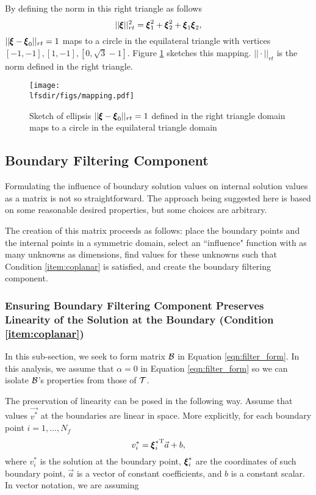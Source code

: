 By defining the norm in this right triangle as follows
\begin{equation}
\label{eqn:rect_norm}
||{\pmb \xi}||^2_{rt} = {\pmb \xi}_1^2 + {\pmb \xi}_2^2 + {\pmb \xi}_1{\pmb \xi}_2,
\end{equation}
$||{\pmb \xi} -{\pmb \xi}_0||_{rt} = 1$ maps to a circle in the equilateral triangle with vertices $[-1,-1],[1,-1],[0,\sqrt{3}-1]$. Figure \ref{fig:mapping} sketches this mapping. $||\cdot||_{rt}$ is the norm defined in the right triangle.


\begin{figure}\centering
\texttt{[image: \\lfsdir/figs/mapping.pdf]}
\caption{Sketch of ellipsis $||{\pmb \xi} -{\pmb \xi}_0||_{rt} = 1$ defined in the right triangle domain maps to a circle in the equilateral triangle domain}
\label{fig:mapping}
\end{figure}

\subsection{Boundary Filtering Component}

Formulating the influence of boundary solution values on internal solution values as a matrix is not so straightforward. The approach being suggested here is based on some reasonable desired properties, but some choices are arbitrary. 

The creation of this matrix proceeds as follows: place the boundary points and the internal points in a symmetric domain, select an ``influence" function with as many unknowns as dimensions, find values for these unknowns such that Condition \ref{item:coplanar} is satisfied, and create the boundary filtering component.

\subsubsection{Ensuring Boundary Filtering Component Preserves Linearity of the Solution at the Boundary (Condition \ref{item:coplanar})}
In this sub-section, we seek to form matrix $\mathcal{B}$ in Equation \ref{eqn:filter_form}. In this analysis, we assume that $\alpha = 0$ in Equation \ref{eqn:filter_form} so we can isolate $\mathcal{B}$'s properties from those of $\mathcal{T}$.

The preservation of linearity can be posed in the following way. Assume that values $\vec{v^*}$ at the boundaries are linear in space. More explicitly, for each boundary point $i = 1,\dots,N_f$
\begin{equation}
v^*_i = {{\pmb \xi}^*_i}^\mathrm{T}\vec{a} + b,
\end{equation}
where $v^*_i$ is the solution at the \ith boundary point, ${\pmb \xi}_i^*$ are the coordinates of such boundary point, $\vec{a}$ is a vector of constant coefficients, and $b$ is a constant scalar. In vector notation, we are assuming

